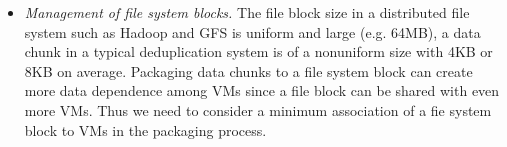 \begin{itemize}
\item{\em  Management of file system blocks.}
The file block size in a distributed file system such as  Hadoop and GFS is uniform and large (e.g.  64MB),
 a data chunk in a typical deduplication system is of a nonuniform size with 4KB or 8KB on average.
Packaging data chunks to a file system block can create more data dependence among VMs
since a file block can be shared with even more VMs.
Thus we need to consider a minimum association of a fie system block to VMs in the packaging process.
\end{itemize}

